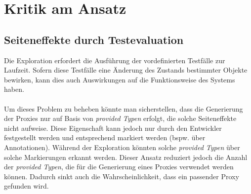 \section{Kritik am Ansatz}
\subsection{Seiteneffekte durch Testevaluation}
Die Exploration erfordert die Ausführung der vordefinierten Testfälle zur Laufzeit. Sofern diese Testfälle eine Änderung des Zustands bestimmter Objekte bewirken, kann dies auch Auswirkungen auf die Funktionsweise des Systems haben. 
\\\\
Um dieses Problem zu beheben könnte man sicherstellen, dass die Generierung der Proxies nur auf Basis von \emph{provided Typen} erfolgt, die solche Seiteneffekte nicht aufweise. Diese Eigenschaft kann jedoch nur durch den Entwickler festgestellt werden und entsprechend markiert werden (bspw. über Annotationen). Während der Exploration könnten solche \emph{provided Typen} über solche Markierungen erkannt werden. Dieser Ansatz reduziert jedoch die Anzahl der \emph{provided Typen}, die für die Generierung eines Proxies verwendet werden können. Dadurch sinkt auch die Wahrscheinlichkeit, dass ein passender Proxy gefunden wird.
